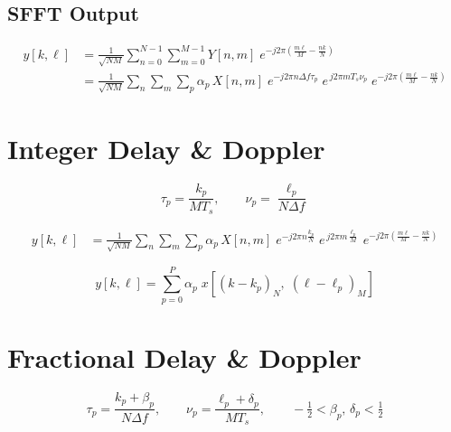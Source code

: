 \documentclass[12pt]{article}
\begin{document}
\subsection*{SFFT Output}

\begin{align}
  y[k,\ell]
  &= \frac{1}{\sqrt{NM}}
    \sum_{n=0}^{N-1}\sum_{m=0}^{M-1}
    Y[n,m]\;e^{-j2\pi\!\left(\frac{m\ell}{M}-\frac{nk}{N}\right)}
  \nonumber\\[6pt]
  &= \frac{1}{\sqrt{NM}}
    \sum_{n}\sum_{m}\sum_{p}
    \alpha_p\,X[n,m]\;
    e^{-j2\pi n\Delta f\tau_p}\;
    e^{\,j2\pi m T_s\nu_p}\;
    e^{-j2\pi\!\left(\frac{m\ell}{M}-\frac{nk}{N}\right)}
\end{align}

\section*{Integer Delay \& Doppler}

\[
  \tau_p = \frac{k_p}{M T_s},
  \qquad
  \nu_p  = \frac{\ell_p}{N\Delta f}
\]

\begin{align}
  y[k,\ell]
  &= \frac{1}{\sqrt{NM}}
     \sum_{n}\sum_{m}\sum_{p}
     \alpha_p\,X[n,m]\;
     e^{-j2\pi n\frac{k_p}{N}}\;
     e^{\,j2\pi m\frac{\ell_p}{M}}\;
     e^{-j2\pi\!\left(\frac{m\ell}{M}-\frac{nk}{N}\right)}
\end{align}

\begin{equation}
  \boxed{y[k,\ell] = \sum_{p=0}^{P}\alpha_p\;
    x\!\left[(k-k_p)_N,\;(\ell-\ell_p)_M\right]}
\end{equation}

\section*{Fractional Delay \& Doppler}

\[
  \tau_p = \frac{k_p+\beta_p}{N\Delta f},
  \qquad
  \nu_p  = \frac{\ell_p+\delta_p}{M T_s},
  \qquad
  -\tfrac{1}{2}<\beta_p,\,\delta_p<\tfrac{1}{2}
\]
\end{document}

